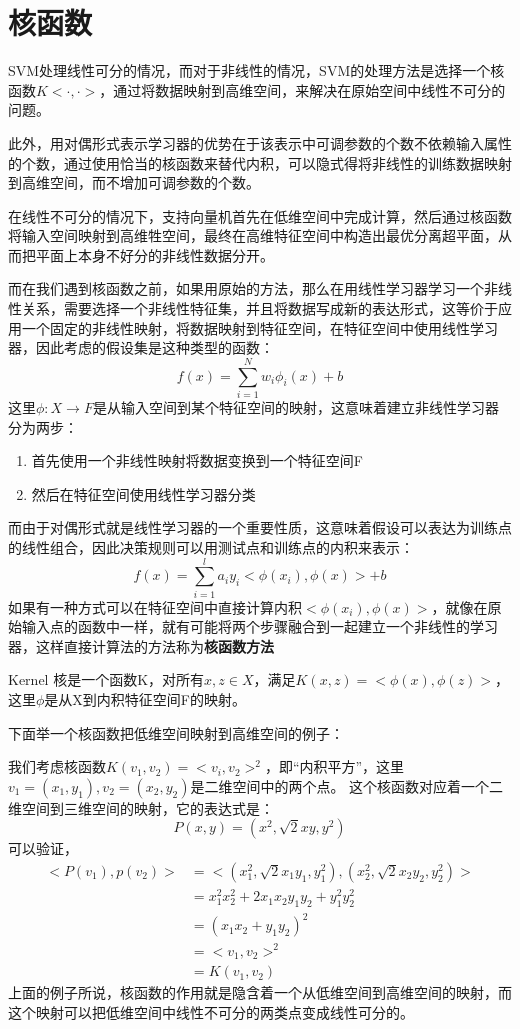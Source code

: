 \section{核函数}
SVM处理线性可分的情况，而对于非线性的情况，SVM的处理方法是选择一个核函数$K<\cdot,\cdot>$，通过将数据映射到高维空间，来解决在原始空间中线性不可分的问题。

此外，用对偶形式表示学习器的优势在于该表示中可调参数的个数不依赖输入属性的个数，通过使用恰当的核函数来替代内积，可以隐式得将非线性的训练数据映射到高维空间，而不增加可调参数的个数。

在线性不可分的情况下，支持向量机首先在低维空间中完成计算，然后通过核函数将输入空间映射到高维牲空间，最终在高维特征空间中构造出最优分离超平面，从而把平面上本身不好分的非线性数据分开。

而在我们遇到核函数之前，如果用原始的方法，那么在用线性学习器学习一个非线性关系，需要选择一个非线性特征集，并且将数据写成新的表达形式，这等价于应用一个固定的非线性映射，将数据映射到特征空间，在特征空间中使用线性学习器，因此考虑的假设集是这种类型的函数：
\begin{equation}
	f(x) = \sum_{i = 1}^Nw_i\phi_i(x) + b
\end{equation}
这里$\phi:X\to F$是从输入空间到某个特征空间的映射，这意味着建立非线性学习器分为两步：
\begin{enumerate}
	\item 首先使用一个非线性映射将数据变换到一个特征空间F
	\item 然后在特征空间使用线性学习器分类 
\end{enumerate}
而由于对偶形式就是线性学习器的一个重要性质，这意味着假设可以表达为训练点的线性组合，因此决策规则可以用测试点和训练点的内积来表示：
\begin{equation}
	f(x) = \sum_{i = 1}^la_iy_i<\phi(x_i),\phi(x)> + b	
\end{equation}
如果有一种方式可以在特征空间中直接计算内积$<\phi(x_i),\phi(x)>$，就像在原始输入点的函数中一样，就有可能将两个步骤融合到一起建立一个非线性的学习器，这样直接计算法的方法称为\textbf{核函数方法}
\begin{definition}{Kernel}{}
	核是一个函数K，对所有$x,z\in X$，满足$K(x,z) = <\phi(x),\phi(z)>$，这里$\phi$是从X到内积特征空间F的映射。
\end{definition}
下面举一个核函数把低维空间映射到高维空间的例子：

我们考虑核函数$K(v_1,v_2) = <v_i,v_2>^2$，即“内积平方”，这里$v_1 = (x_1,y_1),v_2 = (x_2,y_2)$是二维空间中的两个点。
这个核函数对应着一个二维空间到三维空间的映射，它的表达式是：
$$P(x,y) = (x^2,\sqrt{2}xy, y^2)$$
可以验证，
\begin{equation*}
	\begin{aligned}
		<P(v_1), p(v_2)> &= <(x_1^2,\sqrt{2}x_1y_1, y_1^2),(x_2^2,\sqrt{2}x_2y_2, y_2^2)> \\
		&= x_1^2x_2^2 + 2x_1x_2y_1y_2 + y_1^2y_2^2 \\
		&= (x_1x_2 + y_1y_2)^2 \\
		&= <v_1,v_2>^2 \\
		&= K(v_1,v_2)
	\end{aligned}
\end{equation*}
上面的例子所说，核函数的作用就是隐含着一个从低维空间到高维空间的映射，而这个映射可以把低维空间中线性不可分的两类点变成线性可分的。

